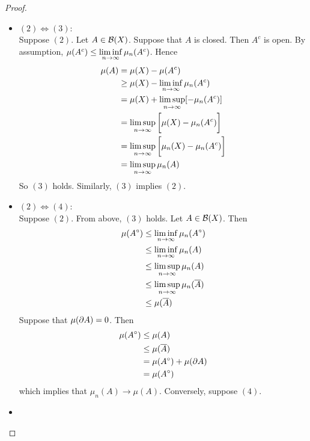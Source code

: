 \documentclass{book}
\begin{document}
	\begin{proof}\
		\begin{itemize}
			\item $(2) \iff (3)$: \\
			Suppose $(2)$. Let $A \in \mathcal{B}(X)$. Suppose that $A$ is closed. Then $A^c$ is open. By assumption, $\mu(A^c) \leq \liminf \limits_{n \rightarrow \infty} \limits \mu_n(A^c)$. Hence 
			\begin{align*}
				\mu(A)
				&= \mu(X) - \mu(A^c) \\
				&\geq \mu(X) - \liminf \limits_{n \rightarrow \infty} \mu_n(A^c) \\
				&= \mu(X) + \limsup \limits_{n \rightarrow \infty} [- \mu_n(A^c)] \\
				&= \limsup \limits_{n \rightarrow \infty} \bigg[ \mu(X)  - \mu_n(A^c) \bigg] \\
				&= \limsup \limits_{n \rightarrow \infty} \bigg[ \mu_n(X)  - \mu_n(A^c) \bigg] \\
				&= \limsup \limits_{n \rightarrow \infty} \mu_n(A)
			\end{align*}
			So $(3)$ holds.
			Similarly, $(3)$ implies $(2)$.\\
			\item $(2) \iff (4)$: \\
			Suppose $(2)$. From above, $(3)$ holds. Let $A \in \mathcal{B}(X)$. Then 
			\begin{align*}
				\mu(A^{\circ}) 
				& \leq \liminf \limits_{n \rightarrow \infty} \mu_n(A^{\circ}) \\
				& \leq  \liminf \limits_{n \rightarrow \infty} \mu_n(A) \\
				& \leq  \limsup \limits_{n \rightarrow \infty} \mu_n(A) \\
				& \leq  \limsup \limits_{n \rightarrow \infty} \mu_n(\overline{A}) \\
				& \leq  \mu(\overline{A}) \\
			\end{align*}
			Suppose that $\mu(\partial A) = 0$. Then
			\begin{align*}
				\mu(A^{\circ}) 
				&\leq \mu(A) \\
				& \leq \mu(\overline{A}) \\
				&= \mu(A^{\circ}) + \mu(\partial A) \\
				&= \mu(A^{\circ}) \\
			\end{align*}
			which implies that $\mu_n(A) \rightarrow \mu(A)$. Conversely, suppose $(4)$. 
			\item 
		\end{itemize}
	\end{proof}
	
	
	
	
	
	
	
	
	
\end{document}
